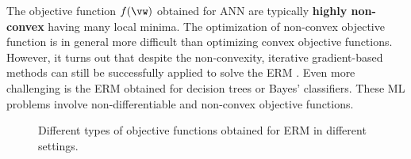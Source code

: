 \documentclass[12pt]{report}
\begin{document}
The objective function $f(\vw)$ obtained for ANN are typically 
{\bf highly non-convex} having many local minima. The optimization 
of non-convex objective function is in general more difficult than 
optimizing convex objective functions. However, it turns out that 
despite the non-convexity, iterative gradient-based methods can 
still be successfully applied to solve the ERM \cite{Goodfellow-et-al-2016}. 
Even more challenging is the ERM obtained for decision trees or 
Bayes' classifiers. These ML problems involve non-differentiable 
and non-convex objective functions. 


	
\begin{figure}[htbp]
\begin{center}
\end{center}
\caption{Different types of objective functions obtained for ERM in different settings.}
\label{fig_diff_types_bojec}
\end{figure}
\end{document}
